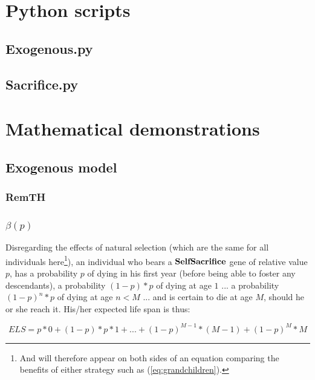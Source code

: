 \documentclass[a4paper,12pt]{report}
\begin{document}

%
%

\appendix

\chapter{Python scripts}
\label{a:scripts}

\section{Exogenous.py}


\section{Sacrifice.py}


\chapter{Mathematical demonstrations}

\section{Exogenous model}
\subsection{RemTH}
\subsection{$\beta(p)$}
\label{beta}

Disregarding the effects of natural selection (which are the same for all individuals 
here\footnote{And will therefore appear on both sides of an equation comparing
the benefits of either strategy such as (\ref{eq:grandchildren}).}),
 an individual who bears a $\bf{SelfSacrifice}$ gene of relative value $p$, has a probability $p$ of dying in his first year
 (before being able to foster any descendants), a probability $(1-p)*p$ of dying at age $1$ ...
 a probability $(1-p)^{n}*p$ of dying at age $n<M$ ... and is certain to die at age $M$, should
 he or she reach it. His/her expected life span is thus:

 \[ ELS = p*0 + (1-p)*p*1 + ... + (1-p)^{M-1}*(M-1) + (1-p)^M*M \]
\end{document}
